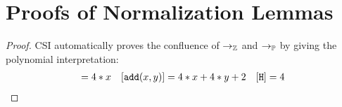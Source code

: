    

    
    
    
    
    


\section{Proofs of Normalization Lemmas}


\begin{lemma}
\begin{proof}
CSI automatically proves the confluence of $\rightarrow_\mathbb{Z}$ and $\rightarrow_\mathbb{P}$ by giving the polynomial interpretation:
\begin{align*}
[\tt{succ}(x)] = 4*x & &[\tt{add}(x, y)] = 4 * x + 4 * y + 2  & &[ {\tt{H}} ] = 4 \\
\end{align*}
\end{proof}
\label{lemma:confluenceZP}
\end{lemma}


